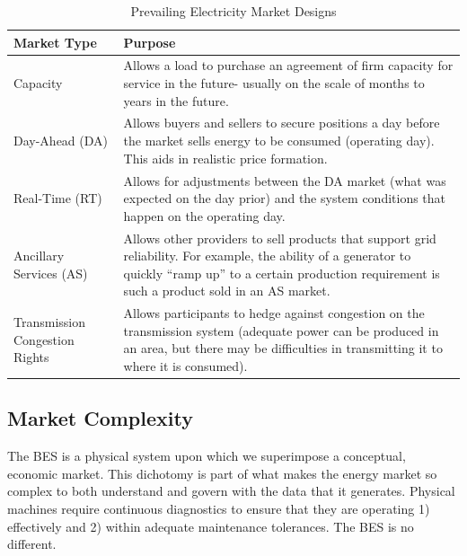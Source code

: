 \begin{table}[ht]
    \centering
    \renewcommand{\arraystretch}{1.2} %
    \begin{tabular}{|p{4.5cm}|p{11cm}|}  %
        \hline
        \textbf{Market Type} & \textbf{Purpose} \\ 
        \hline
        Capacity & Allows a load to purchase an agreement of firm capacity for service in the future- usually on the scale of months to years in the future. \\ 
        \hline
        Day-Ahead (DA) & Allows buyers and sellers to secure positions a day before the market sells energy to be consumed (operating day). This aids in realistic price formation. \\ 
        \hline
        Real-Time (RT) & Allows for adjustments between the DA market (what was expected on the day prior) and the system conditions that happen on the operating day. \\ 
        \hline
        Ancillary Services (AS) & Allows other providers to sell products that support grid reliability. For example, the ability of a generator to quickly “ramp up” to a certain production requirement is such a product sold in an AS market. \\
        \hline
        Transmission Congestion Rights & Allows participants to hedge against congestion on the transmission system (adequate power can be produced in an area, but there may be difficulties in transmitting it to where it is consumed). \\
        \hline
    \end{tabular}
    \caption{Prevailing Electricity Market Designs}
    \label{tab:mktdesign}
\end{table}

\subsection{Market Complexity}

The BES is a physical system upon which we superimpose a conceptual, economic market. This dichotomy is part of what makes the energy market so complex to both understand and govern with the data that it generates. Physical machines require continuous diagnostics to ensure that they are operating 1) effectively and 2) within adequate maintenance tolerances. The BES is no different.

